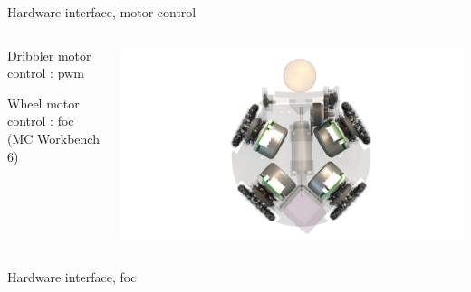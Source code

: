 \begin{frame}{Hardware interface, motor control}

	\begin{columns}[T]
		\begin{column}{0.5\textwidth}

            \vspace{2cm}

            Dribbler motor control : \acf{pwm}

            \vspace{1em}

            Wheel motor control : \acf{foc} (MC Workbench 6)
            
            \end{column}
		\begin{column}{0.5\textwidth}

			\begin{adjustbox}{scale=2.1,center,margin={-1cm,3cm,2cm,0cm}}
				\includegraphics[width=1\textwidth]{image/png/motors_transparent.png}
			\end{adjustbox}

		\end{column}
	\end{columns}

\end{frame}


\begin{frame}{Hardware interface, \acf{foc}}

	\begin{adjustbox}{scale=1,center,margin={0cm,0cm,0cm,0cm}}
	
	\end{adjustbox}

\end{frame}

